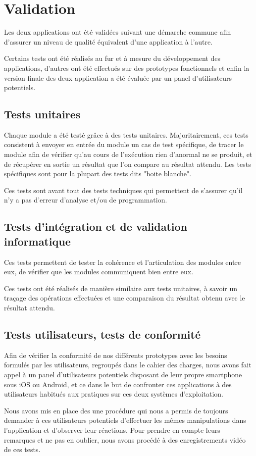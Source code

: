 \documentclass[a4paper, 11px]{article}
\begin{document}
\section{Validation}
Les deux applications ont été validées suivant une démarche commune afin d'assurer un niveau de qualité équivalent d'une application à l'autre.

Certains tests ont été réalisés au fur et à mesure du développement des applications, d'autres ont été effectués sur des prototypes fonctionnels et enfin la version finale des deux application a été évaluée par un panel d'utilisateurs potentiels.

\subsection{Tests unitaires}
Chaque module a été testé grâce à des tests unitaires. Majoritairement, ces tests consistent à envoyer en entrée du module un cas de test spécifique, de tracer le module afin de vérifier qu'au cours de l’exécution rien d'anormal ne se produit, et de récupérer en sortie un résultat que l'on compare au résultat attendu. Les tests spécifiques sont pour la plupart des tests dits "boite blanche".

Ces tests sont avant tout des tests techniques qui permettent de s'assurer qu'il n'y a pas d'erreur d'analyse et/ou de programmation.

\subsection{Tests d'intégration et de validation informatique}
Ces tests permettent de tester la cohérence et l'articulation des modules entre eux, de vérifier que les modules communiquent bien entre eux.

Ces tests ont été réalisés de manière similaire aux tests unitaires, à savoir un traçage des opérations effectuées et une comparaison du résultat obtenu avec le résultat attendu.

\subsection{Tests utilisateurs, tests de conformité}
Afin de vérifier la conformité de nos différents prototypes avec les besoins formulés par les utilisateurs, regroupés dans le cahier des charges, nous avons fait appel à un panel d'utilisateurs potentiels disposant de leur propre smartphone sous iOS ou Android, et ce dans le but de confronter ces applications à des utilisateurs habitués aux pratiques sur ces deux systèmes d'exploitation.

Nous avons mis en place des une procédure qui nous a permis de toujours demander à ces utilisateurs potentiels d'effectuer les mêmes manipulations dans l'application et d'observer leur réactions. Pour prendre en compte leurs remarques et ne pas en oublier, nous avons procédé à des enregistrements vidéo de ces tests.
\end{document}
